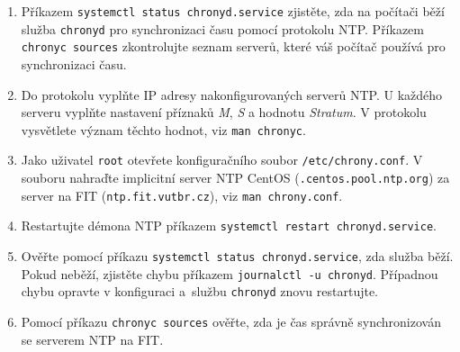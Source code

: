 \documentclass[a4paper,11pt]{article}
\begin{document}
\begin{enumerate}
  \item Příkazem {\tt systemctl status chronyd.service} zjistěte, zda na počítači běží služba \texttt{chronyd} pro synchronizaci času pomocí protokolu NTP. Příkazem {\tt chronyc sources} zkontrolujte seznam serverů, které váš počítač používá
    pro synchronizaci času.

  \item Do protokolu vyplňte IP adresy nakonfigurovaných serverů NTP. 
  U každého serveru vyplňte nastavení příznaků {\em M}, {\em S} a hodnotu {\em Stratum}.
  V protokolu vysvětlete význam těchto hodnot, viz \texttt{man chronyc}.

  \item Jako uživatel \texttt{root} otevřete konfiguračního soubor {\tt /etc/chrony.conf}. V souboru
    nahraďte implicitní server NTP CentOS ({\tt *.centos.pool.ntp.org}) za server na FIT ({\tt ntp.fit.vutbr.cz}), viz {\tt man chrony.conf}.  
  \item Restartujte démona NTP příkazem {\tt systemctl restart chronyd.service}.
  \item Ověřte pomocí příkazu {\tt systemctl status chronyd.service}, zda služba běží. Pokud neběží, zjistěte chybu příkazem {\tt journalctl -u chronyd}. Případnou chybu opravte v konfiguraci a~službu {\tt chronyd} znovu restartujte.
  \item Pomocí příkazu {\tt chronyc sources} ověřte, zda je čas správně synchronizován se serverem NTP na FIT.

\end{enumerate}
\end{document}
